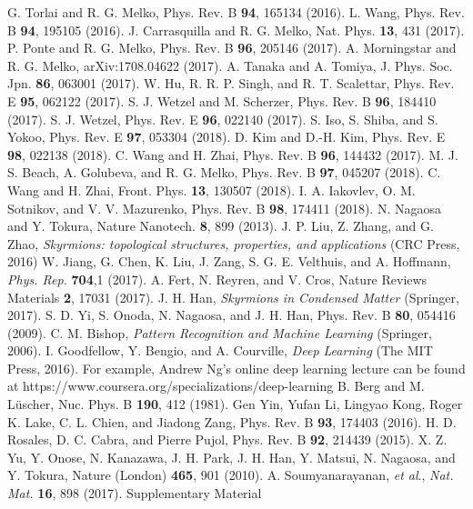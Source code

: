 \documentclass[reprint,amsmath,amssymb,aps,showpacs,superscriptaddress,prl]{revtex4-1}
\begin{document}
\begin{thebibliography}{99}

 G. Torlai and R. G. Melko, Phys. Rev. B {\bf 94}, 165134 (2016).
 L. Wang, Phys. Rev. B {\bf 94}, 195105 (2016).
 J. Carrasquilla and R. G. Melko, Nat. Phys. {\bf 13}, 431 (2017).
 P. Ponte and R. G. Melko, Phys. Rev. B {\bf 96}, 205146 (2017).
 A. Morningstar and R. G. Melko, arXiv:1708.04622 (2017).
 A. Tanaka and A. Tomiya, J. Phys. Soc. Jpn. {\bf 86}, 063001 (2017).
 W. Hu, R. R. P. Singh, and R. T. Scalettar, Phys. Rev. E {\bf 95}, 062122 (2017).
 S. J. Wetzel and M. Scherzer, Phys. Rev. B {\bf 96}, 184410 (2017).
 S. J. Wetzel, Phys. Rev. E {\bf 96}, 022140 (2017).
 S. Iso, S. Shiba, and S. Yokoo, Phys. Rev. E {\bf 97}, 053304 (2018).
 D. Kim and D.-H. Kim, Phys. Rev. E {\bf 98}, 022138 (2018).
 C. Wang and H. Zhai, Phys. Rev. B {\bf 96}, 144432 (2017).
 M. J. S. Beach, A. Golubeva, and R. G. Melko, Phys. Rev. B {\bf 97}, 045207 (2018).
 C. Wang and H. Zhai, Front. Phys. {\bf 13}, 130507 (2018).
 I. A. Iakovlev, O. M. Sotnikov, and V. V. Mazurenko, Phys. Rev. B {\bf 98}, 174411 (2018).
 N. Nagaosa and Y. Tokura, Nature Nanotech. {\bf 8}, 899 (2013).
 J. P. Liu, Z. Zhang, and G. Zhao, {\it Skyrmions: topological structures, properties, and applications} (CRC Press, 2016)
 W. Jiang, G. Chen, K. Liu, J. Zang, S. G. E. Velthuis, and A. Hoffmann, {\it Phys. Rep.} {\bf 704},1 (2017).
 A. Fert, N. Reyren, and V. Cros, Nature Reviews Materials {\bf 2}, 17031 (2017).
 J. H. Han, {\it Skyrmions in Condensed Matter}  (Springer, 2017).
 S. D. Yi, S. Onoda, N. Nagaosa, and J. H. Han, Phys. Rev. B {\bf 80}, 054416 (2009).
 C. M. Bishop, {\it Pattern Recognition and Machine Learning} (Springer, 2006).
 I. Goodfellow, Y. Bengio, and A. Courville, {\it Deep Learning} (The MIT Press, 2016).
 For example, Andrew Ng's online deep learning lecture can be found at https://www.coursera.org/specializations/deep-learning
 B. Berg and M. L\"{u}scher, Nuc. Phys. B {\bf 190}, 412 (1981).
 Gen Yin, Yufan Li, Lingyao Kong, Roger K. Lake, C. L. Chien, and Jiadong Zang, Phys. Rev. B {\bf 93}, 174403 (2016). 
 H. D. Rosales, D. C. Cabra, and Pierre Pujol, Phys. Rev. B {\bf 92}, 214439 (2015).
 X. Z. Yu, Y. Onose, N. Kanazawa, J. H. Park, J. H. Han, Y. Matsui, N. Nagaosa, and Y. Tokura, Nature (London) {\bf 465}, 901 (2010).
 A. Soumyanarayanan, {\it et al}., {\it Nat. Mat.} {\bf 16}, 898 (2017).
 Supplementary Material

\end{thebibliography}

%
%
\end{document}
